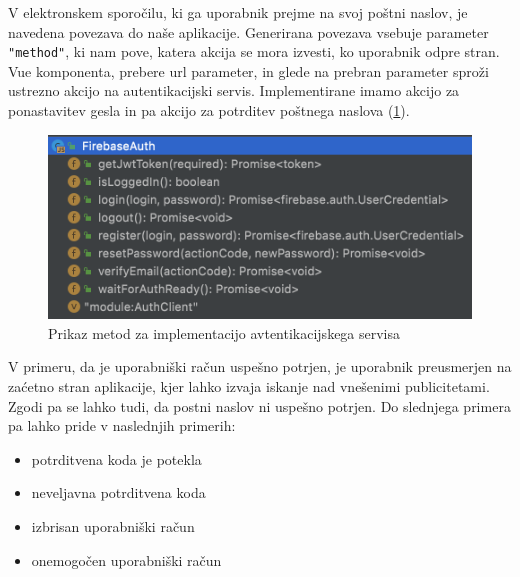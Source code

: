 \documentclass[a4paper, 12pt]{book}
\newenvironment{myitemize}
{ \begin{itemize}
    \setlength{\itemsep}{2pt}
    \setlength{\parskip}{0pt}
    \setlength{\parsep}{2pt}     }
{ \end{itemize}                  }
\begin{document}
V elektronskem sporočilu, ki ga uporabnik prejme na svoj poštni naslov, je navedena povezava do naše aplikacije. Generirana povezava vsebuje parameter \verb="method"=, ki nam pove, katera akcija se mora izvesti, ko uporabnik odpre stran. Vue komponenta, prebere url parameter, in glede na prebran parameter sproži ustrezno akcijo na autentikacijski servis. Implementirane imamo akcijo za ponastavitev gesla in pa akcijo za potrditev poštnega naslova (\ref{auth-methods}).

\begin{figure}[h]
\begin{center}
\includegraphics[width=1\textwidth]{slike/firebase_auth.png}
\end{center}
\caption{ Prikaz metod za implementacijo avtentikacijskega servisa }
\label{auth-methods}
\end{figure}

V primeru, da je uporabniški račun uspešno potrjen, je uporabnik preusmerjen na zaćetno stran aplikacije, kjer lahko izvaja iskanje nad vnešenimi publicitetami. Zgodi pa se lahko tudi, da postni naslov ni uspešno potrjen. Do slednjega primera pa lahko pride v naslednjih primerih:
\begin{myitemize}
  \item potrditvena koda je potekla
  \item neveljavna potrditvena koda
  \item izbrisan uporabniški račun
  \item onemogočen uporabniški račun
\end{myitemize}
\end{document}
